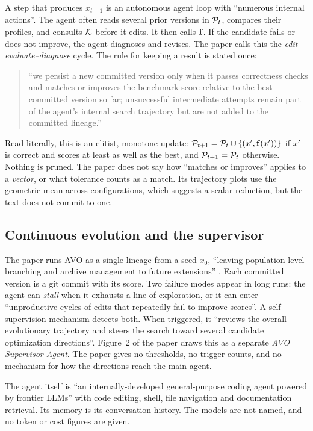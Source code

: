 A step that produces $x_{t+1}$ is an autonomous agent loop with ``numerous internal actions''. The
agent often reads several prior versions in $\mathcal{P}_t$, compares their profiles, and consults $\mathcal{K}$ before
it edits. It then calls $\mathbf{f}$. If the candidate fails or does not improve, the agent diagnoses and
revises. The paper calls this the \emph{edit--evaluate--diagnose} cycle. The rule for keeping a
result is stated once:
\begin{quote}\small
``we persist a new committed version only when it passes correctness checks and matches or improves
the benchmark score relative to the best committed version so far; unsuccessful intermediate
attempts remain part of the agent's internal search trajectory but are not added to the committed
lineage.'' \citep[\S3.2]{chen2026avo}
\end{quote}
Read literally, this is an elitist, monotone update: $\mathcal{P}_{t+1} = \mathcal{P}_t \cup \{(x', \mathbf{f}(x'))\}$ if
$x'$ is correct and scores at least as well as the best, and $\mathcal{P}_{t+1} = \mathcal{P}_t$ otherwise. Nothing is
pruned. The paper does not say how ``matches or improves'' applies to a \emph{vector}, or what
tolerance counts as a match. Its trajectory plots use the geometric mean across configurations,
which suggests a scalar reduction, but the text does not commit to one.

\subsection{Continuous evolution and the supervisor}

The paper runs AVO as a single lineage from a seed $x_0$, ``leaving population-level branching and
archive management to future extensions'' \citep[\S3.3]{chen2026avo}. Each committed version is a
git commit with its score. Two failure modes appear in long runs: the agent can \emph{stall} when it
exhausts a line of exploration, or it can enter ``unproductive cycles of edits that repeatedly fail
to improve scores''. A self-supervision mechanism detects both. When triggered, it ``reviews the
overall evolutionary trajectory and steers the search toward several candidate optimization
directions''. Figure~2 of the paper draws this as a separate \emph{AVO Supervisor Agent}. The paper
gives no thresholds, no trigger counts, and no mechanism for how the directions reach the main
agent.

The agent itself is ``an internally-developed general-purpose coding agent powered by frontier
LLMs'' with code editing, shell, file navigation and documentation retrieval. Its memory is its
conversation history. The models are not named, and no token or cost figures are given.


